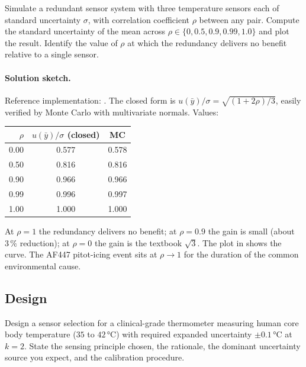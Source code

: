 \begin{exercise}
Simulate a redundant sensor system with three temperature sensors
each of standard uncertainty $\sigma$, with correlation coefficient
$\rho$ between any pair. Compute the standard uncertainty of the
mean across $\rho \in \{0, 0.5, 0.9, 0.99, 1.0\}$ and plot the
result. Identify the value of $\rho$ at which the redundancy
delivers no benefit relative to a single sensor.
\end{exercise}

\paragraph{Solution sketch.} Reference implementation:
. The closed form is
$u(\bar y)/\sigma = \sqrt{(1 + 2\rho)/3}$, easily verified by
Monte Carlo with multivariate normals. Values:
\begin{center}
\begin{tabular}{rcc}
\toprule
$\rho$ & $u(\bar y)/\sigma$ (closed) & MC \\
\midrule
0.00 & 0.577 & 0.578 \\
0.50 & 0.816 & 0.816 \\
0.90 & 0.966 & 0.966 \\
0.99 & 0.996 & 0.997 \\
1.00 & 1.000 & 1.000 \\
\bottomrule
\end{tabular}
\end{center}
At $\rho = 1$ the redundancy delivers no benefit; at $\rho = 0.9$
the gain is small (about $3\,\%$ reduction); at $\rho = 0$ the
gain is the textbook $\sqrt{3}$. The plot in
 shows the curve. The AF447
pitot-icing event sits at $\rho \to 1$ for the duration of the
common environmental cause.

\subsection*{Design}

\begin{exercise}
Design a sensor selection for a clinical-grade thermometer measuring
human core body temperature ($35$ to $42 \,\si{\degreeCelsius}$)
with required expanded uncertainty $\pm 0.1 \,\si{\degreeCelsius}$
at $k = 2$. State the sensing principle chosen, the rationale, the
dominant uncertainty source you expect, and the calibration
procedure.
\end{exercise}

